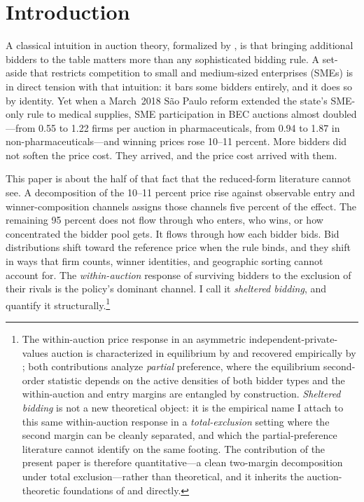 \section{Introduction}

A classical intuition in auction theory, formalized by \citet{bulow1996}, is that bringing additional bidders to the table matters more than any sophisticated bidding rule. A set-aside that restricts competition to small and medium-sized enterprises (SMEs) is in direct tension with that intuition: it bars some bidders entirely, and it does so by identity. Yet when a March~2018 S\~ao Paulo reform extended the state's SME-only rule to medical supplies, SME participation in BEC auctions almost doubled---from 0.55 to 1.22 firms per auction in pharmaceuticals, from 0.94 to 1.87 in non-pharmaceuticals---and winning prices rose 10--11 percent. More bidders did not soften the price cost. They arrived, and the price cost arrived with them.

This paper is about the half of that fact that the reduced-form literature cannot see. A \citet{gelbach2016} decomposition of the 10--11 percent price rise against observable entry and winner-composition channels assigns those channels five percent of the effect. The remaining 95 percent does not flow through who enters, who wins, or how concentrated the bidder pool gets. It flows through how each bidder bids. Bid distributions shift toward the reference price when the rule binds, and they shift in ways that firm counts, winner identities, and geographic sorting cannot account for. The \emph{within-auction} response of surviving bidders to the exclusion of their rivals is the policy's dominant channel. I call it \emph{sheltered bidding}, and quantify it structurally.\footnote{The within-auction price response in an asymmetric independent-private-values auction is characterized in equilibrium by \citet{maskinriley2000} and recovered empirically by \citet{krasnokutskaya2011}; both contributions analyze \emph{partial} preference, where the equilibrium second-order statistic depends on the active densities of both bidder types and the within-auction and entry margins are entangled by construction. \emph{Sheltered bidding} is not a new theoretical object: it is the empirical name I attach to this same within-auction response in a \emph{total-exclusion} setting where the second margin can be cleanly separated, and which the partial-preference literature cannot identify on the same footing. The contribution of the present paper is therefore quantitative---a clean two-margin decomposition under total exclusion---rather than theoretical, and it inherits the auction-theoretic foundations of \citeauthor{maskinriley2000} and \citeauthor{krasnokutskaya2011} directly.}

